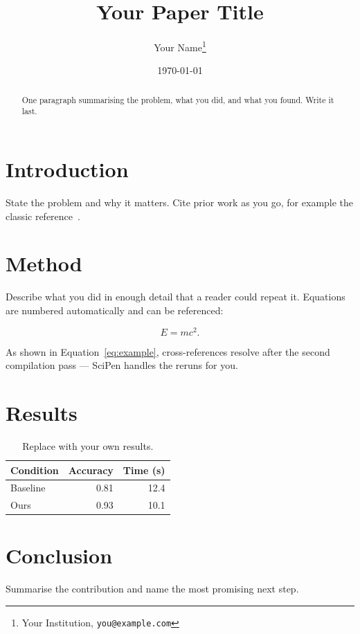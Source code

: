 \documentclass[11pt,a4paper]{article}
\title{Your Paper Title}
\author{Your Name\thanks{Your Institution, \texttt{you@example.com}}}
\date{\today}
\begin{document}
\maketitle

\begin{abstract}
  One paragraph summarising the problem, what you did, and what you found.
  Write it last.
\end{abstract}

\section{Introduction}
\label{sec:introduction}

State the problem and why it matters. Cite prior work as you go, for example
the classic reference~\cite{knuth1984}.

\section{Method}
\label{sec:method}

Describe what you did in enough detail that a reader could repeat it.
Equations are numbered automatically and can be referenced:

\begin{equation}
  \label{eq:example}
  E = mc^2 .
\end{equation}

As shown in Equation~\eqref{eq:example}, cross-references resolve after the
second compilation pass --- SciPen handles the reruns for you.

\section{Results}
\label{sec:results}

\begin{table}[ht]
  \centering
  \begin{tabular}{lrr}
    \toprule
    Condition & Accuracy & Time (s) \\
    \midrule
    Baseline  & 0.81     & 12.4     \\
    Ours      & 0.93     & 10.1     \\
    \bottomrule
  \end{tabular}
  \caption{Replace with your own results.}
  \label{tab:results}
\end{table}

\section{Conclusion}
\label{sec:conclusion}

Summarise the contribution and name the most promising next step.



\end{document}
